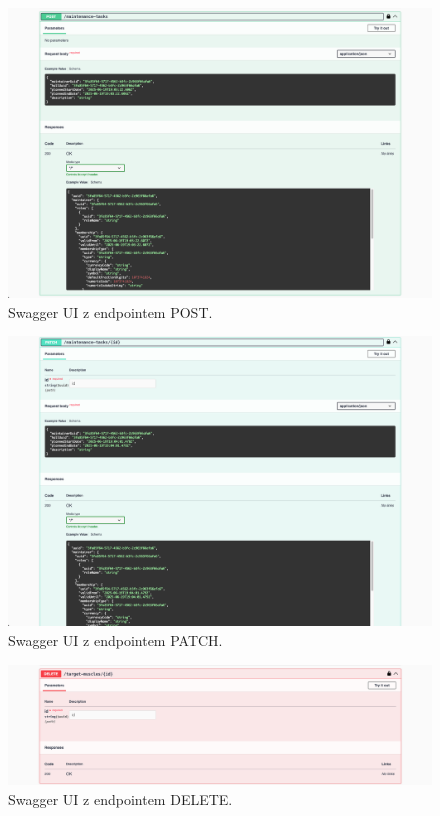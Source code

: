 \documentclass[../../spr.tex]{subfiles}
\begin{document}
\begin{figure}
  \centering
  \includegraphics[width=\textwidth]{swaggerpost.png}
  \caption{Swagger UI z endpointem POST.}
\end{figure}

\begin{figure}
  \centering
  \includegraphics[width=\textwidth]{swaggerpatch.png}
  \caption{Swagger UI z endpointem PATCH.}
\end{figure}

\begin{figure}
  \centering
  \includegraphics[width=\textwidth]{swaggerdelete.png}
  \caption{Swagger UI z endpointem DELETE.}
\end{figure}
\end{document}
